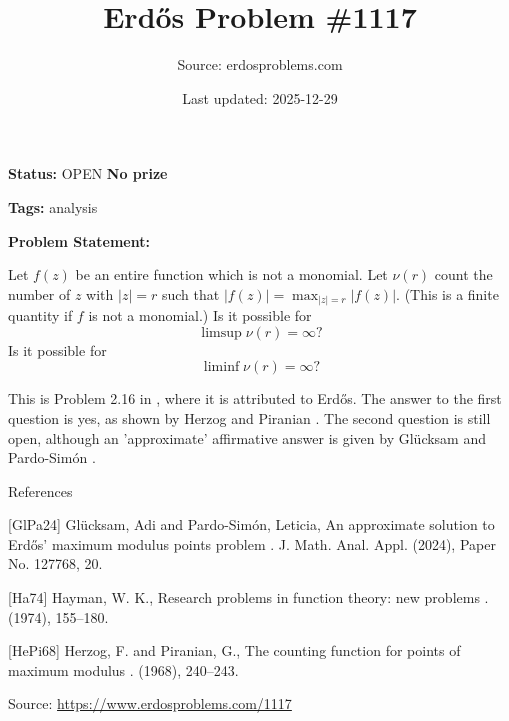 \documentclass{article}
\title{Erd\H{o}s Problem \#1117}
\date{Last updated: 2025-12-29}
\author{Source: erdosproblems.com}
\begin{document}
\maketitle

\noindent\textbf{Status:} OPEN \quad \textbf{No prize}

\noindent\textbf{Tags:} analysis

\medskip

\noindent\textbf{Problem Statement:}

Let $f(z)$ be an entire function which is not a monomial. Let $\nu(r)$ count the number of $z$ with $\lvert z\rvert=r$ such that $\lvert f(z)\rvert=\max_{\lvert z\rvert=r}\lvert f(z)\rvert$. (This is a finite quantity if $f$ is not a monomial.) Is it possible for\[\limsup \nu(r)=\infty?\]Is it possible for\[\liminf \nu(r)=\infty?\]




This is Problem 2.16 in \cite{Ha74}, where it is attributed to Erd\H{o}s. The answer to the first question is yes, as shown by Herzog and Piranian \cite{HePi68}. The second question is still open, although an 'approximate' affirmative answer is given by Gl\"{u}cksam and Pardo-Sim\'{o}n \cite{GlPa24}.




References

[GlPa24] Gl\"ucksam, Adi and Pardo-Sim\'on, Leticia, An approximate solution to {E}rd\H{o}s' maximum modulus points problem . J. Math. Anal. Appl. (2024), Paper No. 127768, 20.

[Ha74] Hayman, W. K., Research problems in function theory: new problems . (1974), 155--180.

[HePi68] Herzog, F. and Piranian, G., The counting function for points of maximum modulus . (1968), 240--243.


\bigskip
\noindent\small{Source: \url{https://www.erdosproblems.com/1117}}
\end{document}
